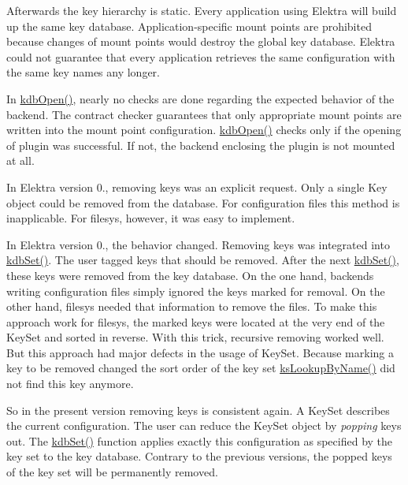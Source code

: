 Afterwards the key hierarchy is static. Every application using Elektra will build up the same key database. Application-\/specific mount points are prohibited because changes of mount points would destroy the global key database. Elektra could not guarantee that every application retrieves the same configuration with the same key names any longer.

In {\ttfamily \hyperlink{group__kdb_ga6808defe5870f328dd17910aacbdc6ca}{kdb\+Open()}}, nearly no checks are done regarding the expected behavior of the backend. The contract checker guarantees that only appropriate mount points are written into the mount point configuration. {\ttfamily \hyperlink{group__kdb_ga6808defe5870f328dd17910aacbdc6ca}{kdb\+Open()}} checks only if the opening of plugin was successful. If not, the backend enclosing the plugin is not mounted at all.

In Elektra version 0., removing keys was an explicit request. Only a single {\ttfamily Key} object could be removed from the database. For configuration files this method is inapplicable. For {\ttfamily filesys}, however, it was easy to implement.

In Elektra version 0., the behavior changed. Removing keys was integrated into {\ttfamily \hyperlink{group__kdb_ga11436b058408f83d303ca5e996832bcf}{kdb\+Set()}}. The user tagged keys that should be removed. After the next {\ttfamily \hyperlink{group__kdb_ga11436b058408f83d303ca5e996832bcf}{kdb\+Set()}}, these keys were removed from the key database. On the one hand, backends writing configuration files simply ignored the keys marked for removal. On the other hand, {\ttfamily filesys} needed that information to remove the files. To make this approach work for {\ttfamily filesys}, the marked keys were located at the very end of the {\ttfamily Key\+Set} and sorted in reverse. With this trick, recursive removing worked well. But this approach had major defects in the usage of {\ttfamily Key\+Set}. Because marking a key to be removed changed the sort order of the key set {\ttfamily \hyperlink{group__keyset_gad65d2cdcbb5381194a1688e169af8a83}{ks\+Lookup\+By\+Name()}} did not find this key anymore.

So in the present version removing keys is consistent again. A {\ttfamily Key\+Set} describes the current configuration. The user can reduce the {\ttfamily Key\+Set} object by {\itshape popping} keys out. The {\ttfamily \hyperlink{group__kdb_ga11436b058408f83d303ca5e996832bcf}{kdb\+Set()}} function applies exactly this configuration as specified by the key set to the key database. Contrary to the previous versions, the popped keys of the key set will be permanently removed.

